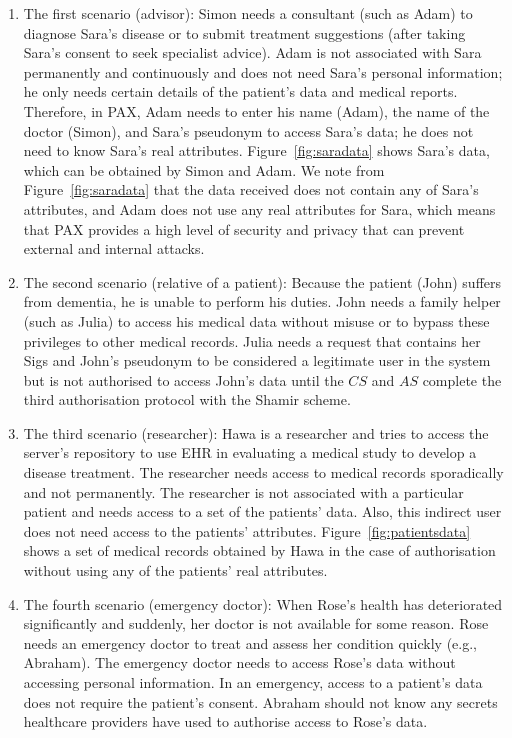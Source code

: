 \documentclass[journal,article,submit,moreauthors,pdftex]{Definitions/mdpi}
\begin{document}
\begin{enumerate}
\item The first scenario (advisor): Simon needs a consultant (such as Adam) to diagnose Sara's disease or to submit treatment suggestions (after taking Sara's consent to seek specialist advice). Adam is not associated with Sara permanently and continuously and does not need Sara's personal information; he only needs certain details of the patient's data and medical reports. Therefore, in PAX, Adam needs to enter his name (Adam), the name of the doctor (Simon), and Sara's pseudonym to access Sara's data; he does not need to know Sara's real attributes. Figure~\ref{fig:saradata} shows Sara's data, which can be obtained by Simon and Adam. We note from Figure~\ref{fig:saradata} that the data received does not contain any of Sara's attributes, and Adam does not use any real attributes for Sara, which means that PAX provides a high level of security and privacy that can prevent external and internal attacks.
\item The second scenario (relative of a patient): Because the patient (John) suffers from dementia, he is unable to perform his duties. John needs a family helper (such as Julia) to access his medical data without misuse or to bypass these privileges to other medical records. Julia needs a request that contains her Sigs and John's pseudonym to be considered a legitimate user in the system but is not authorised to access John's data until the $CS$ and $AS$ complete the third authorisation protocol with the Shamir scheme.
\item The third scenario (researcher): Hawa is a researcher and tries to access the server's repository to use EHR in evaluating a medical study to develop a disease treatment. The researcher needs access to medical records sporadically and not permanently. The researcher is not associated with a particular patient and needs access to a set of the patients' data. Also, this indirect user does not need access to the patients' attributes. Figure~\ref{fig:patientsdata} shows a set of medical records obtained by Hawa in the case of authorisation without using any of the patients' real attributes.
\item The fourth scenario (emergency doctor): When Rose's health has deteriorated significantly and suddenly, her doctor is not available for some reason. Rose needs an emergency doctor to treat and assess her condition quickly (e.g., Abraham). The emergency doctor needs to access Rose's data without accessing personal information. In an emergency, access to a patient's data does not require the patient's consent.  Abraham should not know any secrets healthcare providers have used to authorise access to Rose's data.
\end{enumerate}
\end{document}
